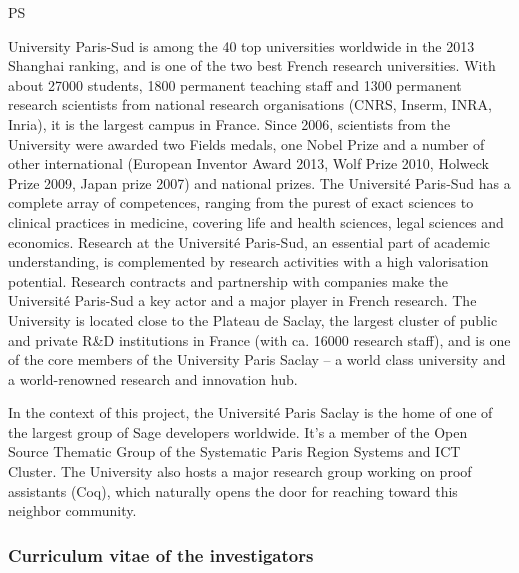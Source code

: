 \begin{sitedescription}{PS}

University Paris-Sud is among the 40 top universities worldwide in the
2013 Shanghai ranking, and is one of the two best French research
universities. With about 27000 students, 1800 permanent teaching staff
and 1300 permanent research scientists from national research
organisations (CNRS, Inserm, INRA, Inria), it is the largest campus in
France. Since 2006, scientists from the University were awarded two
Fields medals, one Nobel Prize and a number of other international
(European Inventor Award 2013, Wolf Prize 2010, Holweck Prize 2009,
Japan prize 2007) and national prizes.  The Université Paris-Sud has a
complete array of competences, ranging from the purest of exact
sciences to clinical practices in medicine, covering life and health
sciences, legal sciences and economics. Research at the Université
Paris-Sud, an essential part of academic understanding, is
complemented by research activities with a high valorisation
potential. Research contracts and partnership with companies make the
Université Paris-Sud a key actor and a major player in French
research.  The University is located close to the Plateau de Saclay,
the largest cluster of public and private R\&D institutions in France
(with ca. 16000 research staff), and is one of the core members of the
University Paris Saclay – a world class university and a
world-renowned research and innovation hub.

In the context of this project, the Université Paris Saclay is the
home of one of the largest group of Sage developers worldwide. It's a
member of the Open Source Thematic Group of the Systematic Paris
Region Systems and ICT Cluster. The University also hosts a major
research group working on proof assistants (Coq), which naturally
opens the door for reaching toward this neighbor community.


\subsubsection*{Curriculum vitae of the investigators}


%

%

%


\end{sitedescription}
